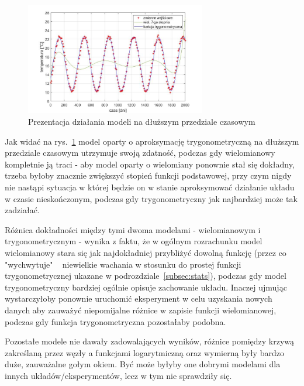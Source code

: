 \documentclass[a4paper, 12pt]{mwart}
\begin{document}
		\begin{figure}[h]
			\begin{center}
				\includegraphics[width = 0.7\textwidth]{graphs/7.jpg}	
				\caption{Prezentacja działania modeli na dłuższym przedziale czasowym}
				\label{fig:7}
			\end{center}
		\end{figure}

		Jak widać na rys.~\ref{fig:7} model oparty o aproksymację trygonometryczną na dłuższym przedziale czasowym utrzymuje
		swoją zdatność, podczas gdy wielomianowy kompletnie ją traci - aby model oparty o wielomiany ponownie stał się 
		dokładny, trzeba byłoby znacznie zwiększyć stopień funkcji podstawowej, przy czym nigdy nie nastąpi sytuacja w której
		będzie on w stanie aproksymować działanie układu w czasie nieskończonym, podczas gdy trygonometryczny jak najbardziej
		może tak zadziałać.

		Różnica dokładności między tymi dwoma modelami - wielomianowym i trygonometrycznym - wynika z faktu, że w ogólnym
		rozrachunku model wielomianowy stara się jak najdokładniej przybliżyć dowolną funkcję (przez co "wychwytuje" ~
		niewielkie wachania w stosunku do prostej funkcji trygonometrycznej ukazane w podrozdziale~\ref{subsec:stats}), 
		podczas gdy model trygonometryczny bardziej ogólnie opisuje zachowanie układu. Inaczej ujmując wystarczyłoby ponownie
		uruchomić eksperyment w celu uzyskania nowych danych aby zauważyć niepomijalne różnice w zapisie funkcji wielomianowej,
		podczas gdy funkcja trygonometryczna pozostałaby podobna.

		Pozostałe modele nie dawały zadowalających wyników, różnice pomiędzy krzywą zakreślaną przez węzły a funkcjami logarytmiczną
		oraz wymierną były bardzo duże, zauważalne gołym okiem. Być może byłyby one dobrymi modelami dla innych układów/eksperymentów,
		lecz w tym nie sprawdziły się.
\end{document}
